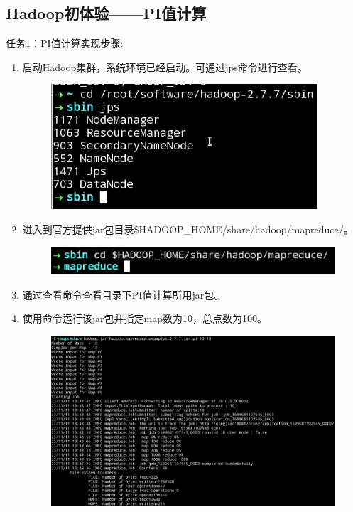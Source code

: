\documentclass {article}
\begin{document}
		\subsection{Hadoop初体验——PI值计算}
			任务1：PI值计算实现步骤:
			\begin{enumerate}
				\item 启动Hadoop集群，系统环境已经启动。可通过jps命令进行查看。
				\begin{figure}[H]
					\centering
					\includegraphics{figures/fig43.png}
				\end{figure}
			
				\item 进入到官方提供jar包目录\$HADOOP\_HOME/share/hadoop/mapreduce/。
				\begin{figure}[H]
					\centering
					\includegraphics{figures/fig44.png}
				\end{figure}
			
				\item 通过查看命令查看目录下PI值计算所用jar包。
				\item 使用命令运行该jar包并指定map数为10，总点数为100。
				\begin{figure}[H]
					\centering
					\includegraphics[width=4.5in]{figures/fig45.png}
				\end{figure}
			

\end{enumerate}
\end{document}
